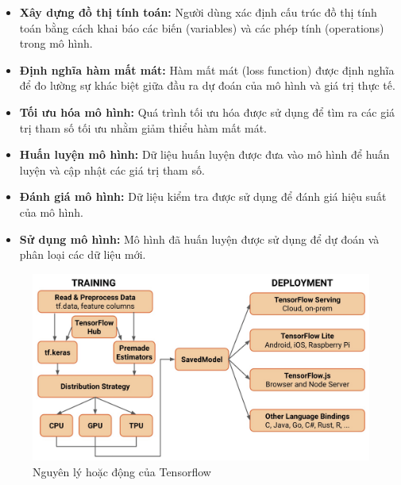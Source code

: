 \begin{itemize}
    \item \textbf{Xây dựng đồ thị tính toán:} Người dùng xác định cấu trúc đồ thị tính toán bằng cách khai báo các biến (variables) và các phép tính (operations) trong mô hình.
    \item \textbf{Định nghĩa hàm mất mát:} Hàm mất mát (loss function) được định nghĩa để đo lường sự khác biệt giữa đầu ra dự đoán của mô hình và giá trị thực tế.
    \item \textbf{Tối ưu hóa mô hình:} Quá trình tối ưu hóa được sử dụng để tìm ra các giá trị tham số tối ưu nhằm giảm thiểu hàm mất mát.
    \item \textbf{Huấn luyện mô hình:} Dữ liệu huấn luyện được đưa vào mô hình để huấn luyện và cập nhật các giá trị tham số.
    \item \textbf{Đánh giá mô hình:} Dữ liệu kiểm tra được sử dụng để đánh giá hiệu suất của mô hình.
    \item \textbf{Sử dụng mô hình:} Mô hình đã huấn luyện được sử dụng để dự đoán và phân loại các dữ liệu mới.
\end{itemize}
\begin{figure}[H]
    \centering
    \includegraphics[width=\textwidth,height=\textheight,keepaspectratio]{Images/Theoretical basis/nguyen-li-hoat-dong-tensorflow.jpeg}
    \caption{Nguyên lý hoặc động của Tensorflow}
    \label{fig:enter-label}
\end{figure}



